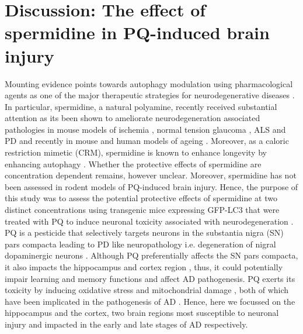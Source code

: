 \section{Discussion: The effect of spermidine in PQ-induced brain injury}
Mounting evidence points towards autophagy modulation using pharmacological agents as one of the major therapeutic strategies for neurodegenerative diseases \citep{Hebron2013,Jiang2014a,Perera2018,Ravikumar2004,Rose2010}. In particular, spermidine, a natural polyamine, recently received substantial attention as its been shown to ameliorate neurodegeneration associated pathologies in mouse models of ischemia \citep{Morrison2002}, normal tension glaucoma \citep{Noro2015}, ALS \citep{Wang2012} and  PD \citep{Buttner2014} and recently in mouse and human models of ageing \citep{Schwarz2018,Wirth2019,Wirth2018}. Moreover, as a caloric restriction mimetic (CRM), spermidine is known to enhance longevity by enhancing autophagy \citep{Marino2014}. Whether the protective effects of spermidine are concentration dependent remains, however unclear. Moreover, spermidine has not been assessed in rodent models of PQ-induced brain injury. Hence, the purpose of this study was to assess the potential protective effects of spermidine at two distinct concentrations using transgenic mice expressing GFP-LC3 \citep{Mizushima2004a} that were treated with PQ to induce neuronal toxicity associated with neurodegeneration \citep{Chen2012}. PQ is a pesticide that selectively targets neurons in the substantia nigra (SN) pars compacta leading to PD like neuropathology i.e. degeneration of nigral dopaminergic neurons \citep{McCormack2005, McCormack2002}. Although PQ preferentially affects the SN pars compacta, it also impacts the hippocampus and cortex region \citep{Landrigan2005}, thus, it could potentially impair learning and memory functions and affect AD pathogenesis. PQ exerts its toxicity by inducing oxidative stress and mitochondrial damage \citep{Baltazar2014,Drechsel2008,Lin2006}, both of which have been implicated in the pathogenesis of AD \citep{Lin2006}. Hence, here we focussed on the hippocampus and the cortex, two brain regions most susceptible to neuronal injury and impacted in the early and late stages of AD respectively.

